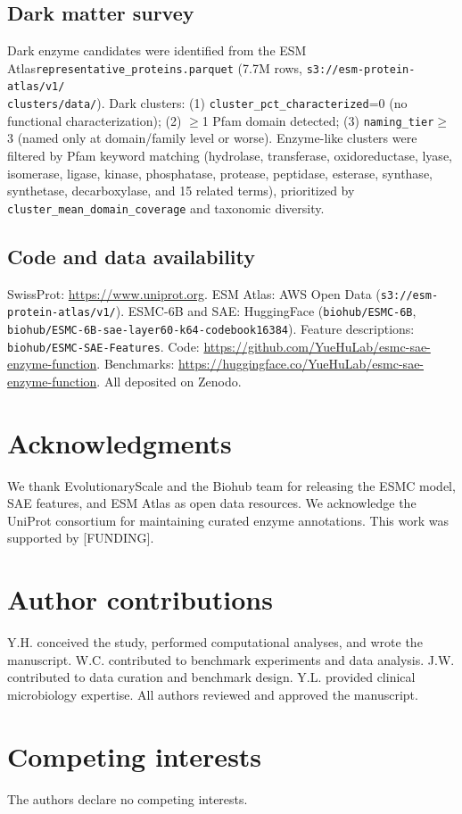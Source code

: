 \documentclass[12pt,a4paper]{article}
\begin{document}
\subsection{Dark matter survey}

Dark enzyme candidates were identified from the ESM Atlas\linebreak\texttt{representative\_proteins.parquet} (7.7M rows, \texttt{s3://esm-protein-atlas/v1/}\\\texttt{clusters/data/}). Dark clusters: (1) \texttt{cluster\_pct\_characterized}=0 (no functional characterization); (2) $\ge$1 Pfam domain detected; (3) \texttt{naming\_tier}$\ge$3 (named only at domain/family level or worse). Enzyme-like clusters were filtered by Pfam keyword matching (hydrolase, transferase, oxidoreductase, lyase, isomerase, ligase, kinase, phosphatase, protease, peptidase, esterase, synthase, synthetase, decarboxylase, and 15 related terms), prioritized by \texttt{cluster\_mean\_domain\_coverage} and taxonomic diversity.

\subsection{Code and data availability}

{\small\sloppy SwissProt: \url{https://www.uniprot.org}. ESM Atlas: AWS Open Data (\texttt{s3://esm-protein-atlas/v1/}). ESMC-6B and SAE: HuggingFace (\texttt{biohub/ESMC-6B}, \texttt{biohub/ESMC-6B-sae-layer60-k64-codebook16384}). Feature descriptions: \texttt{biohub/ESMC-SAE-Features}. Code: \url{https://github.com/YueHuLab/esmc-sae-enzyme-function}. Benchmarks: \url{https://huggingface.co/YueHuLab/esmc-sae-enzyme-function}. All deposited on Zenodo.\par}

\section*{Acknowledgments}

We thank EvolutionaryScale and the Biohub team for releasing the ESMC model, SAE features, and ESM Atlas as open data resources. We acknowledge the UniProt consortium for maintaining curated enzyme annotations. This work was supported by [FUNDING].

\section*{Author contributions}

Y.H. conceived the study, performed computational analyses, and wrote the manuscript. W.C. contributed to benchmark experiments and data analysis. J.W. contributed to data curation and benchmark design. Y.L. provided clinical microbiology expertise. All authors reviewed and approved the manuscript.

\section*{Competing interests}

The authors declare no competing interests.



\end{document}
